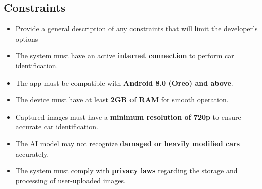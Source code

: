 \documentclass[]{article}
\begin{document}
\subsection{Constraints}
\label{sub:constraints}
\begin{itemize}
	\item Provide a general description of any constraints that will limit the developer's options
	
	\item The system must have an active \textbf{internet connection} to perform car identification.
    \item The app must be compatible with \textbf{Android 8.0 (Oreo) and above}.
    \item The device must have at least \textbf{2GB of RAM} for smooth operation.
    \item Captured images must have a \textbf{minimum resolution of 720p} to ensure accurate car identification.
    \item The AI model may not recognize \textbf{damaged or heavily modified cars} accurately.
    \item The system must comply with \textbf{privacy laws} regarding the storage and processing of user-uploaded images.

\end{itemize}
\end{document}
